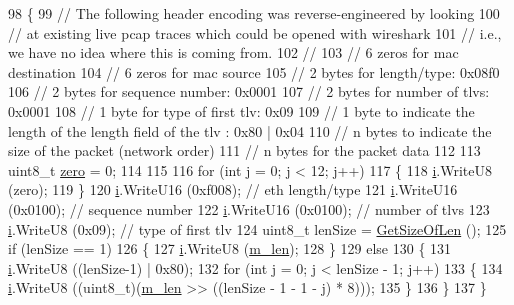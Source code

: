 \begin{DoxyCode}
98 \{
99   \textcolor{comment}{// The following header encoding was reverse-engineered by looking}
100   \textcolor{comment}{// at existing live pcap traces which could be opened with wireshark}
101   \textcolor{comment}{// i.e., we have no idea where this is coming from.}
102   \textcolor{comment}{//}
103   \textcolor{comment}{// 6 zeros for mac destination}
104   \textcolor{comment}{// 6 zeros for mac source}
105   \textcolor{comment}{// 2 bytes for length/type: 0x08f0}
106   \textcolor{comment}{// 2 bytes for sequence number: 0x0001}
107   \textcolor{comment}{// 2 bytes for number of tlvs: 0x0001}
108   \textcolor{comment}{// 1 byte for type of first tlv: 0x09}
109   \textcolor{comment}{// 1 byte to indicate the length of the length field of the tlv : 0x80 | 0x04}
110   \textcolor{comment}{// n bytes to indicate the size of the packet (network order)}
111   \textcolor{comment}{// n bytes for the packet data}
112 
113   uint8\_t \hyperlink{data-calculator_8cc_a548c77babcdf18ce7b6b96e73fb912cd}{zero} = 0;
114 
115 
116   \textcolor{keywordflow}{for} (\textcolor{keywordtype}{int} j = 0; j < 12; j++)
117     \{
118       \hyperlink{bernuolliDistribution_8m_a6f6ccfcf58b31cb6412107d9d5281426}{i}.WriteU8 (zero);
119     \}
120   \hyperlink{bernuolliDistribution_8m_a6f6ccfcf58b31cb6412107d9d5281426}{i}.WriteU16 (0xf008); \textcolor{comment}{// eth length/type}
121   \hyperlink{bernuolliDistribution_8m_a6f6ccfcf58b31cb6412107d9d5281426}{i}.WriteU16 (0x0100); \textcolor{comment}{// sequence number}
122   \hyperlink{bernuolliDistribution_8m_a6f6ccfcf58b31cb6412107d9d5281426}{i}.WriteU16 (0x0100); \textcolor{comment}{// number of tlvs}
123   \hyperlink{bernuolliDistribution_8m_a6f6ccfcf58b31cb6412107d9d5281426}{i}.WriteU8 (0x09); \textcolor{comment}{// type of first tlv}
124   uint8\_t lenSize = \hyperlink{classns3_1_1WimaxMacToMacHeader_a1f3d74adc741d8e938b7c4a51ea3eb2b}{GetSizeOfLen} ();
125   \textcolor{keywordflow}{if} (lenSize == 1)
126     \{
127       \hyperlink{bernuolliDistribution_8m_a6f6ccfcf58b31cb6412107d9d5281426}{i}.WriteU8 (\hyperlink{classns3_1_1WimaxMacToMacHeader_ae00de1c6c413ab383c21d1386799ab1c}{m\_len});
128     \}
129   \textcolor{keywordflow}{else}
130     \{
131       \hyperlink{bernuolliDistribution_8m_a6f6ccfcf58b31cb6412107d9d5281426}{i}.WriteU8 ((lenSize-1) | 0x80);
132       \textcolor{keywordflow}{for} (\textcolor{keywordtype}{int} j = 0; j < lenSize - 1; j++)
133         \{
134           \hyperlink{bernuolliDistribution_8m_a6f6ccfcf58b31cb6412107d9d5281426}{i}.WriteU8 ((uint8\_t)(\hyperlink{classns3_1_1WimaxMacToMacHeader_ae00de1c6c413ab383c21d1386799ab1c}{m\_len} >> ((lenSize - 1 - 1 - j) * 8)));
135         \}
136     \}
137 \}
\end{DoxyCode}


